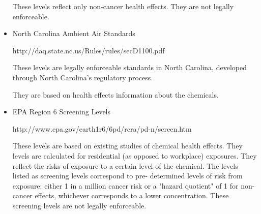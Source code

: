 \documentclass{article}
\begin{document}
\begin{itemize}
These levels reflect only non-cancer health effects. They are not
legally enforceable.
\item North Carolina Ambient Air Standards


http://daq.state.nc.us/Rules/rules/secD1100.pdf


These levels are legally enforceable standards in North Carolina, developed through North Carolina's regulatory process.


They are based on health effects information about the chemicals.
\item EPA Region 6 Screening Levels


http://www.epa.gov/earth1r6/6pd/rcra/pd-n/screen.htm


These levels are based on existing studies of chemical health effects.
They levels are calculated for residential (as opposed to workplace)
exposures. They reflect the risks of exposure to a certain level of the
chemical. The levels listed as screening levels correspond to pre-
determined levels of risk from exposure: either 1 in a million cancer risk
or a "hazard quotient" of 1 for non-cancer effects, whichever
corresponds to a lower concentration. These screening levels are not
legally enforceable.

\end{itemize}
\end{document}
